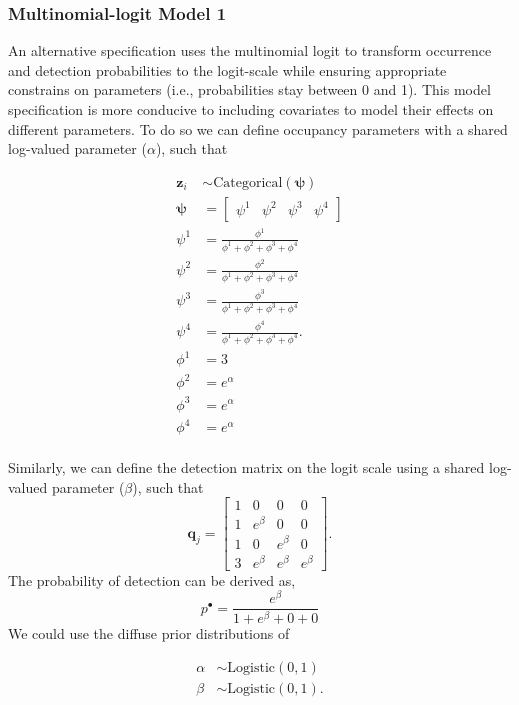 \documentclass[12pt]{article}
\begin{document}
\subsubsection{Multinomial-logit Model 1}
An alternative specification uses the multinomial logit to transform occurrence and detection probabilities to the logit-scale while ensuring appropriate constrains on parameters (i.e., probabilities stay between 0 and 1). This model specification is more conducive to including covariates to model their effects on different parameters. To do so we can define occupancy parameters with a shared log-valued parameter ($\alpha$), such that 
\begin{center}
\begin{align*}
\textbf{z}_{i} &\sim \text{Categorical}(\boldsymbol{\psi})\\
\boldsymbol{\psi} &= \begin{bmatrix} \psi^1 & \psi^2 & \psi^3 & \psi^4 \end{bmatrix}\\
\psi^1 &=\frac{\phi^1}{\phi^1+ \phi^2+\phi^3+\phi^4}\\
\psi^2 &=\frac{\phi^2}{\phi^1+ \phi^2+\phi^3+\phi^4}\\
\psi^3 &=\frac{\phi^3}{\phi^1+ \phi^2+\phi^3+\phi^4}\\
\psi^4 &=\frac{\phi^4}{\phi^1+ \phi^2+\phi^3+\phi^4}.\\
\phi^1 &= 3\\
\phi^2 &= e^{\alpha}\\
\phi^3 &= e^{\alpha}\\
\phi^4 &= e^{\alpha}\\
\end{align*}
\end{center}

Similarly, we can define the detection matrix on the logit scale using a shared log-valued parameter ($\beta$), such that 
\begin{equation}
\boldsymbol{q}_{j} = \begin{bmatrix} 1 & 0 & 0 & 0 \\ 
									1 &  e^{\beta} & 0 & 0 \\ 
									1 & 0 & e^{\beta} & 0\\
  								       3 & e^{\beta} & e^{\beta} & e^{\beta}
  								      \end{bmatrix}.
\end{equation}
The probability of detection can be derived as, 
\begin{equation}
p^{\bullet} =\frac{e^{\beta}}{1+e^{\beta}+0+0}
\end{equation}
We could use the diffuse prior distributions of 
\begin{center}
\begin{align*}
\alpha &\sim \text{Logistic}(0,1)\\
\beta &\sim \text{Logistic}(0,1).\\
\end{align*}
\end{center}
\end{document}

